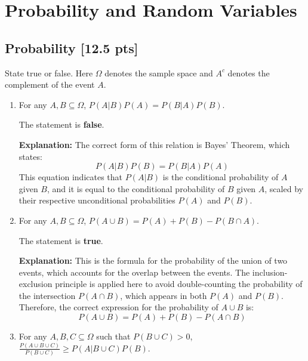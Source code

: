\documentclass[letter]{article}
\theoremstyle{definition}
\newenvironment{soln}{
	\leavevmode\color{black}\ignorespaces
}{}
\begin{document}
	
	
\pagebreak	
	
	\section{Probability and Random Variables }
	\subsection{Probability [12.5 pts]}
	State true or false. Here $\Omega$ denotes the sample space and $A^c$ denotes the complement of the event $A$.
	\begin{enumerate}
		\item For any $A, B \subseteq \Omega$, $P(A|B)P(A) = P(B|A)P(B)$.\\
		
            \begin{soln}
                The statement is \textbf{false}.
                
                \textbf{Explanation:} The correct form of this relation is Bayes' Theorem, which states:
                \[
                P(A|B)P(B) = P(B|A)P(A)
                \]
                This equation indicates that \( P(A|B) \) is the conditional probability of \( A \) given \( B \), and it is equal to the conditional probability of \( B \) given \( A \), scaled by their respective unconditional probabilities \( P(A) \) and \( P(B) \).
            \end{soln}
		
		\item For any $A, B \subseteq \Omega$, $P(A \cup B) = P(A) + P(B) - P(B \cap A)$.\\         
		
            \begin{soln}
                The statement is \textbf{true}.
                
                \textbf{Explanation:} This is the formula for the probability of the union of two events, which accounts for the overlap between the events. The inclusion-exclusion principle is applied here to avoid double-counting the probability of the intersection \( P(A \cap B) \), which appears in both \( P(A) \) and \( P(B) \). Therefore, the correct expression for the probability of \( A \cup B \) is:
                \[
                P(A \cup B) = P(A) + P(B) - P(A \cap B)
                \]
            \end{soln}
		
		\item For any $A, B, C \subseteq \Omega$ such that $P(B \cup C) > 0$,
		$\frac{P(A \cup B \cup C)}{P(B \cup C)} \geq P(A | B \cup C) P(B)$.\\ 
		

\end{enumerate}
\end{document}
